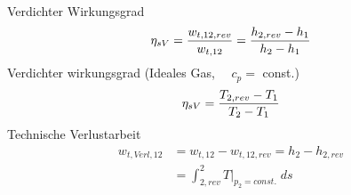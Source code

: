 \documentclass[twocolumn]{article}
\begin{document}
\\
Verdichter Wirkungsgrad
\begin{equation*}
	\eta_{sV} = \frac{w_{t,12,rev}}{w_{t,12}} = \frac{h_{2,rev} - h_1}{h_2 - h_1} \\
\end{equation*}
Verdichter wirkungsgrad (Ideales Gas, $\quad c_p = $ const.)
\begin{equation*}
	\eta_{sV} = \frac{T_{2,rev} - T_1}{T_2 -T_1} \\
\end{equation*}
Technische Verlustarbeit
\begin{align*}
	w_{t,Verl,12} 	&= w_{t,12} - w_{t,12,rev} = h_2 - h_{2,rev} \\
			&= \int_{2,rev}^{2} T|_{p_2=const.}\; ds
\end{align*}

\pagebreak
\end{document}
